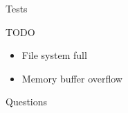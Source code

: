 \documentclass[14pt]{beamer}
\begin{document}
\begin{frame}{Tests}
\end{frame}

\begin{frame}{TODO}
\begin{itemize}
    \item File system full
    \item Memory buffer overflow
\end{itemize}
\end{frame}

\begin{frame}{Questions}
\begin{center}
\end{center}
\end{frame}
\end{document}
